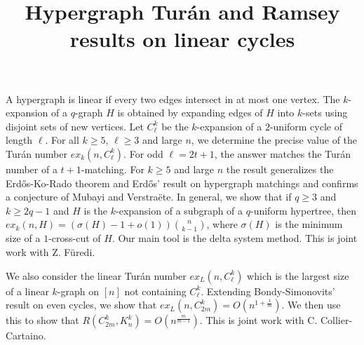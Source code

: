 \title{Hypergraph Tur\'an and Ramsey results on linear cycles}
\endtitle

A hypergraph is linear if every two edges intersect in at most
one vertex. The $k$-expansion of a $q$-graph $H$ is obtained by
expanding edges of $H$ into $k$-sets using disjoint sets of new vertices.
Let $C^{k}_\ell$ be the $k$-expansion of a $2$-uniform 
cycle of length $\ell$.
For all $k\geq 5$, $\ell\geq 3$ and  large $n$, 
we determine the precise value of the Tur\'an number
$ex_k(n,C^k_\ell)$. For odd $\ell=2t+1$, the answer matches
the Tur\'an number of a $t+1$-matching. For $k\geq 5$ and large $n$ the result
generalizes the Erd\H{o}s-Ko-Rado theorem and Erd\H{o}s'
result on hypergraph matchings and confirms a conjecture of
Mubayi and Verstra\"ete. In general, we show that
if $q\geq 3$ and $k\geq 2q-1$ and $H$
is the $k$-expansion of a subgraph of a $q$-uniform hypertree, 
then $ex_k(n,H)=(\sigma(H)-1+o(1))\binom{n}{k-1}$,
where $\sigma(H)$ is the minimum size of a $1$-cross-cut of $H$.
Our main tool is the delta system method. This is joint work with Z. F\"uredi.

\medskip

We also consider the linear Tur\'an number $ex_L(n,C^k_\ell)$
which is the largest size of a linear $k$-graph on $[n]$
not containing $C^k_\ell$. Extending Bondy-Simonovits' result on even cycles, 
we show that $ex_L(n,C^k_{2m})=O(n^{1+\frac{1}{m}})$. We then use this to show that $R(C^k_{2m}, K^k_n)=O(n^{\frac{m}{m-1}})$.
This is joint work with C. Collier-Cartaino.

